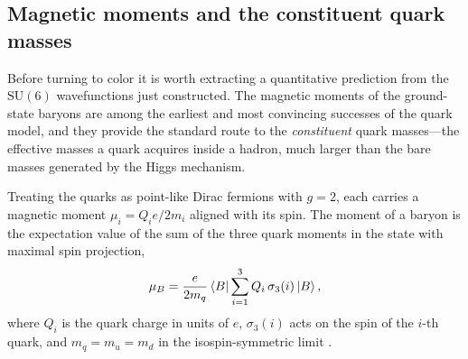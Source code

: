 \FloatBarrier

\subsection{Magnetic moments and the constituent quark masses}
\label{subsec:magnetic-moments}

Before turning to color it is worth extracting a quantitative prediction from the
$\mathrm{SU}(6)$ wavefunctions just constructed. The magnetic moments of the ground-state
baryons are among the earliest and most convincing successes of the quark model, and they
provide the standard route to the \emph{constituent} quark masses---the effective masses a
quark acquires inside a hadron, much larger than the bare masses generated by the Higgs
mechanism.

Treating the quarks as point-like Dirac fermions with $g = 2$, each carries a magnetic
moment $\mu_i = Q_i e / 2 m_i$ aligned with its spin. The moment of a baryon is the
expectation value of the sum of the three quark moments in the state with maximal spin
projection,
\begin{equation}
    \mu_B = \frac{e}{2 m_q}
    \bra{B} \sum_{i=1}^{3} Q_i \,\sigma_{3}(i) \ket{B},
    \label{eq:magnetic-moment-operator}
\end{equation}
where $Q_i$ is the quark charge in units of $e$, $\sigma_3(i)$ acts on the spin of the
$i$-th quark, and $m_q = m_u = m_d$ in the isospin-symmetric limit
\cite[Ch.~15]{Amsler2018}.

